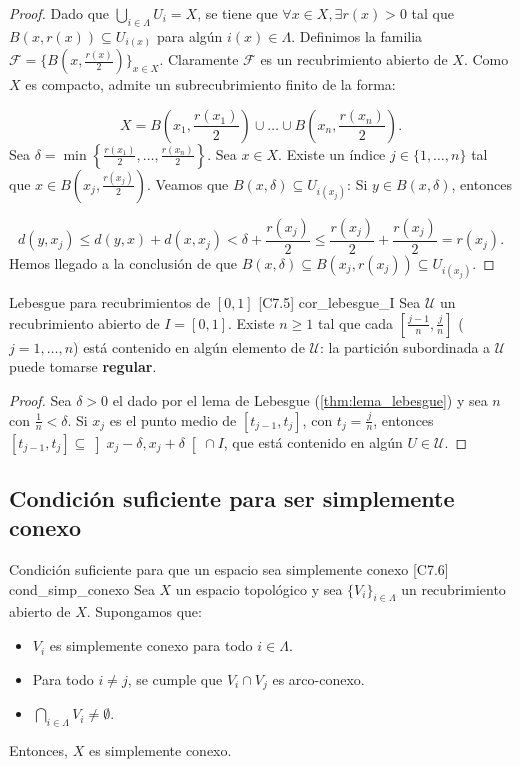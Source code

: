 \begin{proof}
Dado que $\bigcup_{i \in \Lambda} U_i = X$, se tiene que $\forall x \in X, \exists r(x) > 0$ tal que $B(x, r(x)) \subseteq U_{i(x)}$ para algún $i(x) \in \Lambda$.
Definimos la familia $\mathcal{F} = \{B(x, \frac{r(x)}{2})\}_{x \in X}$. Claramente $\mathcal{F}$ es un recubrimiento abierto de $X$. Como $X$ es compacto, admite un subrecubrimiento finito de la forma:

$$X = B\left(x_1, \frac{r(x_1)}{2}\right) \cup \dots \cup B\left(x_n, \frac{r(x_n)}{2}\right).$$
Sea $\delta = \min \left\{ \frac{r(x_1)}{2}, \dots, \frac{r(x_n)}{2} \right\}$.
Sea $x \in X$. Existe un índice $j \in \{1, \dots, n\}$ tal que $x \in B(x_j, \frac{r(x_j)}{2})$. Veamos que $B(x,\delta) \subseteq U_{i(x_j)}$:
Si $y \in B(x,\delta)$, entonces

$$d(y, x_j) \le d(y,x) + d(x,x_j) < \delta + \frac{r(x_j)}{2} \le \frac{r(x_j)}{2} + \frac{r(x_j)}{2} = r(x_j).$$
Hemos llegado a la conclusión de que $B(x,\delta) \subseteq B(x_j, r(x_j)) \subseteq U_{i(x_j)}$.
\end{proof}

\begin{proposicion}{Lebesgue para recubrimientos de $[0,1]$ [C7.5] \marcaC}{cor_lebesgue_I}
Sea $\mathcal{U}$ un recubrimiento abierto de $I = [0,1]$. Existe $n \geq 1$ tal que cada $\left[\frac{j-1}{n}, \frac{j}{n}\right]$ ($j = 1,\dots,n$) está contenido en algún elemento de $\mathcal{U}$: la partición subordinada a $\mathcal{U}$ puede tomarse \textbf{regular}.
\end{proposicion}

\begin{proof}
Sea $\delta > 0$ el dado por el lema de Lebesgue (\cref{thm:lema_lebesgue}) y sea $n$ con $\frac1n < \delta$. Si $x_j$ es el punto medio de $[t_{j-1},t_j]$, con $t_j = \frac jn$, entonces $[t_{j-1},t_j] \subseteq \left]x_j - \delta, x_j + \delta\right[ \cap I$, que está contenido en algún $U \in \mathcal{U}$.
\end{proof}

\subsection{Condición suficiente para ser simplemente conexo}

\begin{teorema}{Condición suficiente para que un espacio sea simplemente conexo [C7.6] \marcaT}{cond_simp_conexo}
Sea $X$ un espacio topológico y sea $\{V_i\}_{i \in \Lambda}$ un recubrimiento abierto de $X$. Supongamos que:
\begin{itemize}
\item[a)] $V_i$ es simplemente conexo para todo $i \in \Lambda$.
\item[b)] Para todo $i \neq j$, se cumple que $V_i \cap V_j$ es arco-conexo.
\item[c)] $\bigcap_{i \in \Lambda} V_i \neq \emptyset$.
\end{itemize}
Entonces, $X$ es simplemente conexo. 
\end{teorema}



